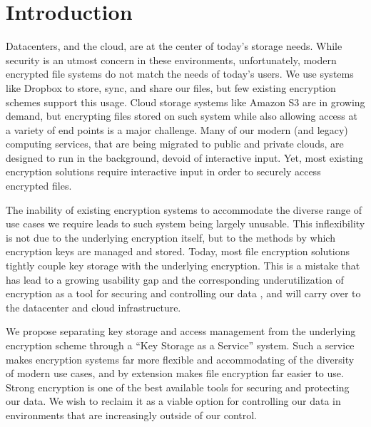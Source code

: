 \section{Introduction}
\label{sec:intro}

Datacenters, and the cloud, are at the center of today's storage needs.
While security is an utmost concern in these environments,
unfortunately, modern encrypted file systems do not match the needs
of today's users.  
We use systems like Dropbox to store, sync, and
share our files, but few existing encryption schemes support this
usage. Cloud storage systems like Amazon S3 are in
growing demand, but encrypting files stored on such system while also
allowing access at a variety of end points is a major challenge. Many
of our modern (and legacy) computing services, that are being migrated
to public and private clouds, are designed to run in
the background, devoid of interactive input.  Yet, most existing
encryption solutions require interactive input in order to securely
access encrypted files. 

The inability of existing encryption systems
to accommodate the diverse range of use cases we require leads to such
system being largely unusable. This inflexibility is not due to the
underlying encryption itself, but to the methods by which encryption
keys are managed and stored. Today, most file encryption solutions
tightly couple key storage with the underlying encryption. This is a
mistake that has lead to a growing usability gap and the corresponding
underutilization of encryption as a tool for securing and controlling
our data \cite{Whitten1999, Sweikata2009, Kher2005, Geambasu2011}, and
will carry over to the datacenter and cloud infrastructure.

We propose separating key storage and access management from the
underlying encryption scheme through a ``Key Storage as a Service''
system. Such a service makes encryption systems far more flexible and
accommodating of the diversity of modern use cases, and by extension
makes file encryption far easier to use. Strong encryption is one of
the best available tools for securing and protecting our data. We wish
to reclaim it as a viable option for controlling our data in
environments that are increasingly outside of our control.


